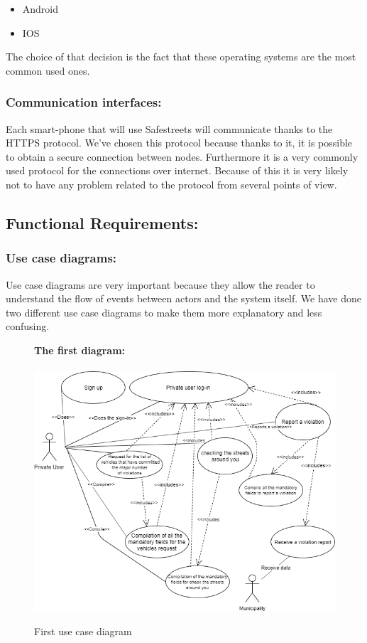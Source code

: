 \documentclass[titlepage]{article}
\begin{document}
\begin{itemize}
	\item Android 
	\item IOS
\end{itemize}	
The choice of that decision is the fact that these operating systems are the most common used ones.
	
\subsubsection{Communication interfaces: }
Each smart-phone that will use Safestreets will communicate thanks to the HTTPS protocol. We've chosen this protocol because thanks to it, it is possible to obtain a secure connection between nodes. Furthermore it is a very commonly used protocol for the connections over internet. Because of this it is very likely not to have any problem related to the protocol from several points of view.
\subsection{Functional Requirements:}
\subsubsection{Use case diagrams: }
Use case diagrams are very important because they allow the reader to understand the flow of events between actors and the system itself. We have done two different use case diagrams to make them more explanatory and less confusing.

\begin{figure}[h]
	\textbf{The first diagram:\\ \\}
	\includegraphics[scale=0.65]{use case diagrams/use case diagrams.png}
	\centering
	\caption{First use case diagram}
\end{figure}
\FloatBarrier
\end{document}
